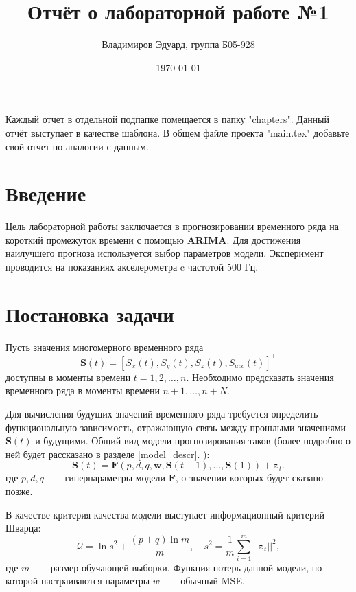 \documentclass[a4paper,14pt]{article}
\author{Владимиров Эдуард, группа Б05-928}
\title{\textbf{Отчёт о лабораторной работе №1}}
\date{\today}
\renewcommand{\epsilon}{\ensuremath{\varepsilon}}
\newcommand{\bS}{\mathbf{S}}
\newcommand{\bF}{\mathbf{F}}
\newcommand{\bw}{\mathbf{w}}
\newcommand{\T}{^{\mathsf{T}}}
\theoremstyle{plain} %
\theoremstyle{definition} %
\theoremstyle{remark} %
\begin{document}
	\maketitle
	Каждый отчет в отдельной подпапке помещается в папку "chapters".
	Данный отчёт выступает в качестве шаблона. В общем файле проекта "main.tex" добавьте свой отчет по аналогии с данным.
	
	\section{Введение}
	Цель лабораторной работы заключается в прогнозировании временного ряда на короткий промежуток времени с помощью \textbf{ARIMA}.
	Для достижения наилучшего прогноза используется выбор параметров модели. Эксперимент проводится на показаниях акселерометра c частотой 500 Гц.
	
	\section{Постановка задачи}
	Пусть значения многомерного временного ряда  
	\[ \bS(t) = [S_x(t), S_y(t), S_z(t), S_{acc}(t)] \T \]
	доступны в моменты времени $t = 1, 2, \ldots, n$. Необходимо предсказать значения временного ряда в моменты времени $n+1, \ldots, n+N$.  
	
	Для вычисления будущих значений временного ряда требуется определить функциональную зависимость, отражающую связь между прошлыми значениями $\bS(t)$ и будущими. Общий вид модели прогнозирования таков (более подробно о ней будет рассказано в разделе \ref{model_descr}. ):
	\begin{equation*}
		\bS(t) = \bF(p, d, q, \bw, \bS(t-1), \ldots, \bS(1)) + \boldsymbol{\epsilon}_t.
	\end{equation*}
	где $p, d, q $ ~--- гиперпараметры модели $\bF$, о значении которых будет сказано позже.
	
	В качестве критерия качества модели выступает информационный критерий Шварца:
	\begin{equation*}
		\mathcal{Q} = \ln s^2 + \dfrac{(p + q) \ln m}{m}, \quad s^2 = \frac1m \sum\limits_{i=1}^m ||\boldsymbol{\epsilon}_t||^2,
	\end{equation*}
	где $m$ ~--- размер обучающей выборки. Функция потерь данной модели, по которой настраиваются параметры $w$ ~--- обычный MSE.
	
\end{document}

